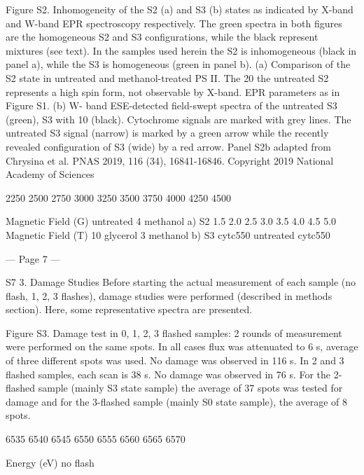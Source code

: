 Figure S2. Inhomogeneity of the S2 (a) and S3 (b) states as indicated by X-band and W-band EPR spectroscopy 
respectively. The green spectra in both figures are the homogeneous S2 and S3 configurations, while the black 
represent mixtures (see text). In the samples used herein the S2 is inhomogeneous (black in panel a), while the 
S3 is homogeneous (green in panel b). (a) Comparison of the S2 state in untreated and methanol-treated PS II. 
The 20%
the untreated S2 represents a high spin form, not observable by X-band. EPR parameters as in Figure S1. (b) W-
band ESE-detected field-swept spectra of the untreated S3 (green), S3 with 10%
(black). Cytochrome signals are marked with grey lines. The untreated S3 signal (narrow) is marked by a green 
arrow while the recently revealed configuration of S3 (wide) by a red arrow. Panel S2b adapted from Chrysina 
et al. PNAS 2019, 116 (34), 16841-16846. Copyright 2019 National Academy of Sciences 
 
2250 2500 2750 3000 3250 3500 3750 4000 4250 4500
 
 
 
Magnetic Field (G)
untreated
4%
methanol
a) S2
1.5          2.0          2.5          3.0           3.5          4.0          4.5         5.0
Magnetic Field (T)
10%
glycerol
3%
methanol
b) S3
cytc550
untreated
cytc550


--- Page 7 ---
 
S7 
3. Damage Studies 
Before starting the actual measurement of each sample (no flash, 1, 2, 3 flashes), damage studies 
were performed (described in methods section). Here, some representative spectra are presented. 
 
Figure S3. Damage test in 0, 1, 2, 3 flashed samples: 2 rounds of measurement were performed on the same 
spots. In all cases flux was attenuated to 6%
s, average of three different spots was used. No damage was observed in 116 s. In 2 and 3 flashed samples, each 
scan is 38 s. No damage was observed in 76 s. For the 2-flashed sample (mainly S3 state sample) the average of 
37 spots was tested for damage and for the 3-flashed sample (mainly S0 state sample), the average of 8 spots.  
 
 
6535 6540
6545
6550
6555
6560
6565
6570
 
 
 
 Energy (eV)
no ﬂash
 
